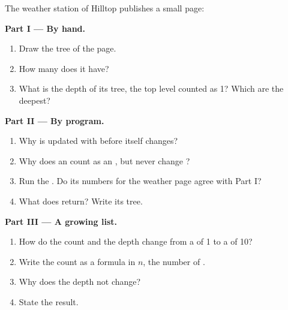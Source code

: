 \begin{problem}\label{pb:g9:html-and-css:1}
The weather station of Hilltop publishes a small page:

\label{lst:g9:html-and-css:weather}

\medskip\noindent\textbf{Part I --- By hand.}
\begin{enumerate}
  \item Draw the tree of the page.
  \item How many  does it have?
  \item What is the depth of its tree, the top level counted as 1? Which
     are the deepest?
\end{enumerate}

\medskip\noindent\textbf{Part II --- By program.}

\label{lst:g9:html-and-css:stats}

\begin{enumerate}[resume]
  \item Why is  updated with  before
     itself changes?
  \item Why does an  count as an , but never change
    ?
  \item Run the . Do its numbers for the weather page agree with
    Part I?
  \item What does  return? Write its tree.
\end{enumerate}

\medskip\noindent\textbf{Part III --- A growing list.}
\begin{enumerate}[resume]
  \item How do the count and the depth change from a  of 1  to a 
    of 10?
  \item Write the count as a formula in $n$, the number of .
  \item Why does the depth not change?
  \item State the result.
\end{enumerate}
\end{problem}
